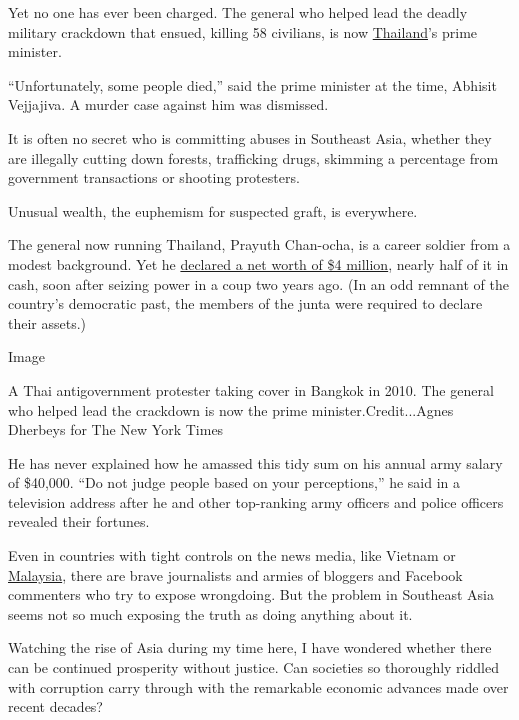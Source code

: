 Yet no one has ever been charged. The general who helped lead the deadly
military crackdown that ensued, killing 58 civilians, is now
\href{http://topics.nytimes.com/top/news/international/countriesandterritories/thailand/index.html?inline=nyt-geo}{Thailand}'s
prime minister.

``Unfortunately, some people died,'' said the prime minister at the
time, Abhisit Vejjajiva. A murder case against him was dismissed.

It is often no secret who is committing abuses in Southeast Asia,
whether they are illegally cutting down forests, trafficking drugs,
skimming a percentage from government transactions or shooting
protesters.

Unusual wealth, the euphemism for suspected graft, is everywhere.

The general now running Thailand, Prayuth Chan-ocha, is a career soldier
from a modest background. Yet he
\href{http://www.nytimes.com/2015/02/10/world/asia/thailand-junta-drowning-the-opposition-in-paperwork.html}{declared
a net worth of \$4 million}, nearly half of it in cash, soon after
seizing power in a coup two years ago. (In an odd remnant of the
country's democratic past, the members of the junta were required to
declare their assets.)

Image

A Thai antigovernment protester taking cover in Bangkok in 2010. The
general who helped lead the crackdown is now the prime
minister.Credit...Agnes Dherbeys for The New York Times

He has never explained how he amassed this tidy sum on his annual army
salary of \$40,000. ``Do not judge people based on your perceptions,''
he said in a television address after he and other top-ranking army
officers and police officers revealed their fortunes.

Even in countries with tight controls on the news media, like Vietnam or
\href{http://topics.nytimes.com/top/news/international/countriesandterritories/malaysia/index.html?inline=nyt-geo}{Malaysia},
there are brave journalists and armies of bloggers and Facebook
commenters who try to expose wrongdoing. But the problem in Southeast
Asia seems not so much exposing the truth as doing anything about it.

Watching the rise of Asia during my time here, I have wondered whether
there can be continued prosperity without justice. Can societies so
thoroughly riddled with corruption carry through with the remarkable
economic advances made over recent decades?


